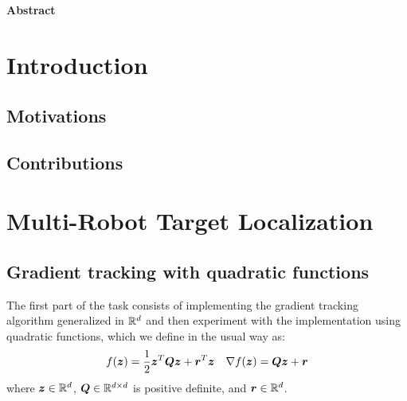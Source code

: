 \documentclass[a4paper,11pt,oneside]{book}
\begin{document}
\newpage
\thispagestyle{empty}

\begin{center}
\chapter*{}
\thispagestyle{empty}
{\Huge \textbf{Abstract}}\\
\vspace{15mm}
\end{center}

\tableofcontents \thispagestyle{empty}

\chapter*{Introduction}
\section*{Motivations} 

\section*{Contributions}


\chapter{Multi-Robot Target Localization}

\section{Gradient tracking with quadratic functions}

The first part of the task consists of implementing the gradient tracking algorithm generalized in ${\mathbb{R}}^d$ and then experiment with the implementation using quadratic functions, which we define in the usual way as:
\[
      f({\bm{z}}) = \frac{1}{2} {\bm{z}}^T {\bm{Q}} {\bm{z}} + {\bm{r}}^T {\bm{z}}
      \quad
      \nabla f({\bm{z}}) = {\bm{Q}} {\bm{z}} + {\bm{r}}
\]
where ${\bm{z}} \in {\mathbb{R}}^{d}$, ${\bm{Q}} \in {\mathbb{R}}^{d \times d}$ is positive definite, and ${\bm{r}} \in {\mathbb{R}}^{d}$.
\end{document}
